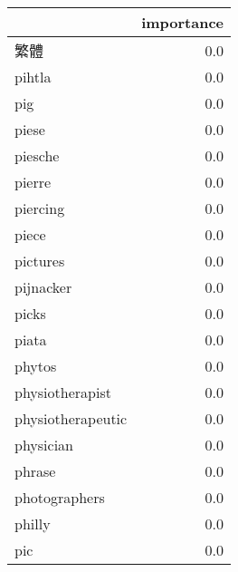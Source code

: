 \begin{tabular}{lr}
\toprule
{} &  importance \\
\midrule
繁體                &         0.0 \\
pihtla            &         0.0 \\
pig               &         0.0 \\
piese             &         0.0 \\
piesche           &         0.0 \\
pierre            &         0.0 \\
piercing          &         0.0 \\
piece             &         0.0 \\
pictures          &         0.0 \\
pijnacker         &         0.0 \\
picks             &         0.0 \\
piata             &         0.0 \\
phytos            &         0.0 \\
physiotherapist   &         0.0 \\
physiotherapeutic &         0.0 \\
physician         &         0.0 \\
phrase            &         0.0 \\
photographers     &         0.0 \\
philly            &         0.0 \\
pic               &         0.0 \\
\bottomrule
\end{tabular}
